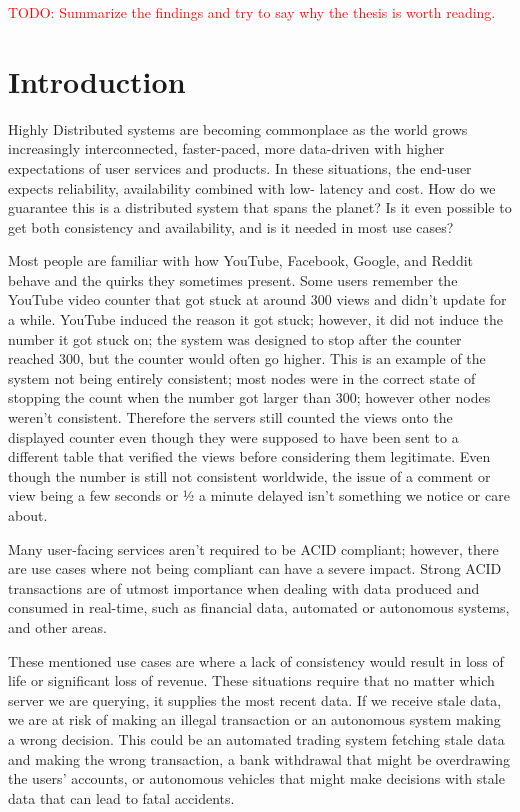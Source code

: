 \documentclass[a4paper,10pt,titlepage]{report}
\begin{document}
\textcolor{red}{TODO: Summarize the findings and try to say why the thesis is worth reading.}




\chapter{Introduction}
Highly Distributed systems are becoming commonplace as the world grows increasingly interconnected, faster-paced, more data-driven with higher expectations of user services and products. In these situations, the end-user expects reliability, availability combined with low- latency and cost. How do we guarantee this is a distributed system that spans the planet? Is it even possible to get both consistency and availability, and is it needed in most use cases?\\
\vspace{5mm}


Most people are familiar with how YouTube, Facebook, Google, and Reddit behave and the quirks they sometimes present. Some users remember the YouTube video counter that got stuck at around 300 views and didn't update for a while. YouTube induced the reason it got stuck; however, it did not induce the number it got stuck on; the system was designed to stop after the counter reached 300, but the counter would often go higher. This is an example of the system not being entirely consistent; most nodes were in the correct state of stopping the count when the number got larger than 300; however other nodes weren't consistent. Therefore the servers still counted the views onto the displayed counter even though they were supposed to have been sent to a different table that verified the views before considering them legitimate. Even though the number is still not consistent worldwide, the issue of a comment or view being a few seconds or ½ a minute delayed isn't something we notice or care about. 

Many user-facing services aren't required to be ACID compliant; however, there are use cases where not being compliant can have a severe impact. Strong ACID transactions are of utmost importance when dealing with data produced and consumed in real-time, such as financial data, automated or autonomous systems, and other areas. 

These mentioned use cases are where a lack of consistency would result in loss of life or significant loss of revenue. These situations require that no matter which server we are querying, it supplies the most recent data. If we receive stale data, we are at risk of making an illegal transaction or an autonomous system making a wrong decision. This could be an automated trading system fetching stale data and making the wrong transaction, a bank withdrawal that might be overdrawing the users' accounts, or autonomous vehicles that might make decisions with stale data that can lead to fatal accidents. \\
\end{document}

